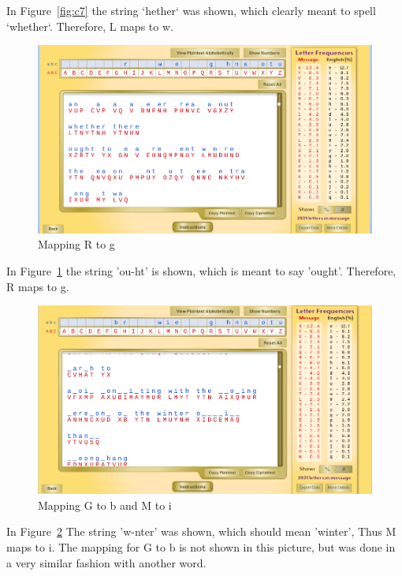 \documentclass[12pt]{article}
\begin{document}
In Figure~\ref{fig:c7} the string `hether` was shown, which clearly meant to spell `whether`. Therefore, L maps to w.

\begin{figure}[H]
    \begin{center}
        \includegraphics[scale=0.48]{c8.png}
    \end{center}{}
    \caption{Mapping R to g}
    \label{fig:c8}
\end{figure}

In Figure~\ref{fig:c8} the string 'ou-ht' is shown, which is meant to say 'ought'. Therefore, R maps to g.

\begin{figure}[H]
    \begin{center}
        \includegraphics[scale=0.48]{c9.png}
    \end{center}{}
    \caption{Mapping G to b and M to i}
    \label{fig:c9}
\end{figure}

In Figure~\ref{fig:c9} The string 'w-nter' was shown, which should mean 'winter', Thus M maps to i. The mapping for G to
b is not shown in this picture, but was done in a very similar fashion with another word.
\end{document}
